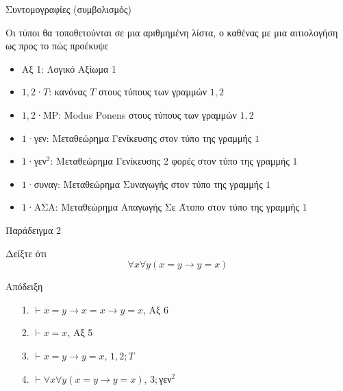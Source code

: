 \documentclass{beamer}
\begin{document}
\begin{frame}{Συντομογραφίες (συμβολισμός)}
  \begin{block}{}
    Οι τύποι θα τοποθετούνται σε μια αριθμημένη λίστα, ο καθένας με μια αιτιολογήση ως προς το πώς προέκυψε
    \begin{itemize}
      \item Αξ 1: Λογικό Αξίωμα 1
      \item $1,2$·$T$: κανόνας $T$ στους τύπους των γραμμών $1,2$
      \item $1,2$·MP: Μodus Ponens στους τύπους των γραμμών $1,2$
      \item $1$·γεν: Μεταθεώρημα Γενίκευσης στον τύπο της γραμμής $1$
      \item $1$·γεν$^2$: Μεταθεώρημα Γενίκευσης 2 φορές στον τύπο της γραμμής $1$
      \item $1$·συναγ: Μεταθεώρημα Συναγωγής στον τύπο της γραμμής $1$
      \item $1$·ΑΣΑ: Μεταθεώρημα Απαγωγής Σε Άτοπο στον τύπο της γραμμής $1$
    \end{itemize}
  \end{block}
\end{frame}

\begin{frame}{Παράδειγμα 2}
  \begin{block}{}
  Δείξτε ότι
    \[
      \forall x \forall y (x = y \rightarrow y = x)
    \]
  \end{block}
  \begin{block}{Απόδειξη}
    \begin{itemize}
      \item[1.] $\vdash x = y \rightarrow x = x \rightarrow y = x$, Αξ 6
      \item[2.] $\vdash x = x$, Αξ 5
      \item[3.] $\vdash x = y \rightarrow y = x$, $1,2;T$
      \item[4.] $\vdash \forall x \forall y (x = y \rightarrow y = x)$, $3;$γεν$^2$
    \end{itemize}
  \end{block}
\end{frame}
\end{document}
